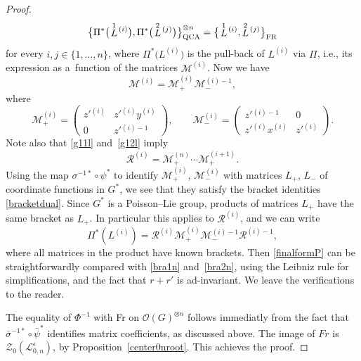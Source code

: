 \documentclass[pdftex]{sigma}%
\numberwithin{equation}{section}
\numberwithin{figure}{section}
\newcommand{\Ll}{{\mathcal L}}
\begin{document}
\begin{proof}
\begin{equation}\label{finalformP}
\big\{\Pi^*\big(\!\stackrel{1}{L}\!{}^{(i)}\big),\Pi^*\big(\!\stackrel{2}{L}\!{}^{(j)}\big)\big\}_{\rm QCA}^{\otimes n} = \big\{\!\stackrel{1}{L}\!{}^{(i)},\stackrel{2}{L}\!{}^{(j)}\big\}_{\rm FR}
\end{equation}
for every $i,j\in \{1,\dots,n\}$, where $\Pi^*\big(L^{(i)}\big)$ is the pull-back of $L^{(i)}$ via $\Pi$, i.e., its expression as a~function of the matrices $\mathcal{M}^{(i)}$. Now we have
\begin{equation}\label{splitmat}
\mathcal{M}^{(i)} = \mathcal{M}^{(i)}_+\mathcal{M}^{(i)-1}_-,
\end{equation}
where
\[
\mathcal{M}^{(i)}_+ = \begin{pmatrix} z'{}^{(i)} & z'{}^{(i)}y{}^{(i)} \\ 0 & z'{}^{(i)-1} \end{pmatrix}\!, \qquad
\mathcal{M}^{(i)}_- = \begin{pmatrix} z'{}^{(i)-1} & 0 \\ z'{}^{(i)}x{}^{(i)} & z'{}^{(i)} \end{pmatrix}\!.
\]
Note also that \eqref{g11l} and~\eqref{g12l} imply
\begin{equation}\label{Gi+-}
\mathcal{R}^{(i)} = \mathcal{M}^{(n)}_+\cdots \mathcal{M}^{(i+1)}_+.
\end{equation}
Using the map $\sigma^{-1*}\circ \psi^*$ to identify $\mathcal{M}^{(i)}_+$, $\mathcal{M}^{(i)}_-$ with matrices $L_+$, $L_-$ of coordinate functions in $G^*$, we see that they satisfy the bracket identities \eqref{bracketdual}. Since $G^*$ is a Poisson--Lie group, products of matrices $L_+$ have the same bracket as $L_+$. In particular this applies to $\mathcal{R}^{(i)}$, and we can write
\[
\Pi^*(L^{(i)}) =\mathcal{R}^{(i)}\!\!\mathcal{M}^{(i)}_+\!\!\mathcal{M}^{(i)-1}_-\mathcal{R}^{(i)-1},
\]
where all matrices in the product have known brackets. Then \eqref{finalformP} can be straightforwardly compared with \eqref{bra1n} and~\eqref{bra2n}, using the Leibniz rule for simplifications, and the fact that $r+r'$ is ad-invariant. We leave the verifications to the reader.

The equality of $\Phi^{-1}$ with Fr on $\mathcal{O}(G)^{\otimes n}$ follows immediatly from the fact that $\bar \sigma^{-1*}\circ \bar{\psi}^*$ identifies matrix coefficients, as discussed above. The image of $Fr$ is $\mathcal{Z}_0(\Ll_{0,n}^\epsilon)$, by Proposition~\ref{center0nroot}. This achieves the proof.
\end{proof}
\end{document}
